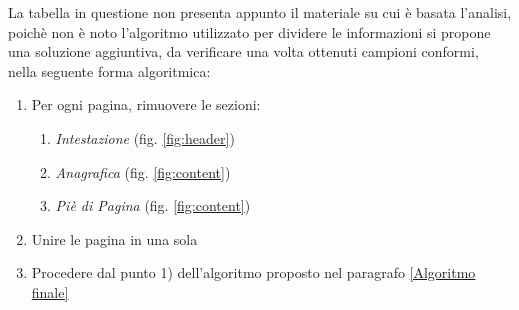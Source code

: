 La tabella in questione non presenta appunto il materiale su cui è basata l'analisi, poichè non è noto l'algoritmo utilizzato per dividere le informazioni si propone una soluzione aggiuntiva, da verificare una volta ottenuti campioni conformi, nella seguente forma algoritmica:
\begin{enumerate}
	\item Per ogni pagina, rimuovere le sezioni:
	\begin{enumerate}
		\item \textit{Intestazione} (fig. \ref{fig:header})
		\item \textit{Anagrafica} (fig. \ref{fig:content})	
		\item \textit{Piè di Pagina} (fig. \ref{fig:content})
	\end{enumerate}	
	\item Unire le pagina in una sola
	\item Procedere dal punto 1) dell'algoritmo proposto nel paragrafo \ref{Algoritmo finale}
\end{enumerate}







